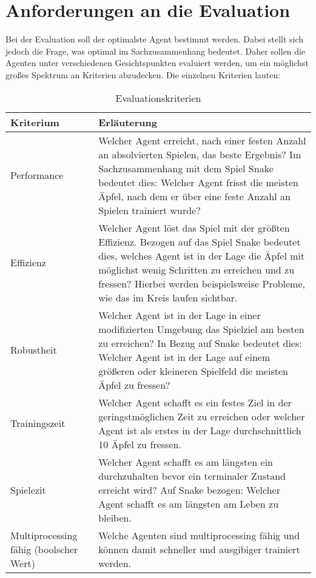 \section{Anforderungen an die Evaluation}
Bei der Evaluation soll der optimalste Agent bestimmt werden. Dabei stellt sich jedoch die Frage, was optimal im Sachzusammenhang bedeutet. 
Daher sollen die Agenten unter verschiedenen Gesichtspunkten evaluiert werden, um ein möglichst großes Spektrum an Kriterien abzudecken.
Die einzelnen Kriterien lauten:
\begin{longtable}[h]{|p{4cm}|p{\linewidth - 5cm}|}
	\caption{Evaluationskriterien}
	\label{tab:Kriterien} 
	\endfirsthead
	\endhead
	\hline
	Kriterium & Erläuterung \\
	\hline
	Performance & Welcher Agent erreicht, nach einer festen Anzahl an absolvierten Spielen, das beste Ergebnis? Im Sachzusammenhang mit dem Spiel Snake bedeutet dies: Welcher Agent frisst die meisten Äpfel, nach dem er über eine feste Anzahl an Spielen trainiert wurde?  \\
	\hline
	Effizienz & Welcher Agent löst das Spiel mit der größten Effizienz. Bezogen auf das Spiel Snake bedeutet dies, welches Agent ist in der Lage die Äpfel mit möglichst wenig Schritten zu erreichen und zu fressen? Hierbei werden beispielsweise Probleme, wie das im Kreis laufen sichtbar. \\
	\hline
	Robustheit & Welcher Agent ist in der Lage in einer modifizierten Umgebung das Spielziel am besten zu erreichen? In Bezug auf Snake bedeutet dies: Welcher Agent ist in der Lage auf einem größeren oder kleineren Spielfeld die meisten Äpfel zu fressen?  \\
	\hline
	Trainingszeit & Welcher Agent schafft es ein festes Ziel in der geringstmöglichen Zeit zu erreichen oder welcher Agent ist als erstes in der Lage durchschnittlich 10 Äpfel zu fressen. \\
	\hline
	Spielezit & Welcher Agent schafft es am längsten ein durchzuhalten bevor ein terminaler Zustand erreicht wird? Auf Snake bezogen: Welcher Agent schafft es am längsten am Leben zu bleiben.  \\
	\hline
	Multiprocessing fähig (boolscher Wert) & Welche Agenten sind multiprocessing fähig und können damit schneller und ausgibiger trainiert werden. \\
	\hline
\end{longtable}